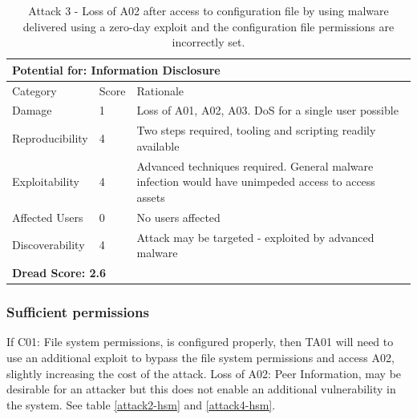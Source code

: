 \documentclass [11pt, proquest] {uwthesis}[2020/02/24]
\begin{document}
\begin{table}[H]
\label{attack3-hsm}
\begin{tabular}{|m{3cm}|m{.9cm}|p{27em} |}
\multicolumn{3}{l}{Potential for: Information Disclosure}                   \\
\hline
Category & Score & Rationale \\
\hline
Damage          & 1     & Loss of A01, A02, A03. DoS for a single user possible            \\
\hline
Reproducibility & 4     & Two steps required, tooling and scripting readily available    \\
\hline
Exploitability & 4      & Advanced techniques required. General malware infection would have unimpeded access to access assets  \\
\hline
Affected Users  & 0     & No users affected                        \\
\hline
Discoverability & 4     & Attack may be targeted - exploited by advanced malware \\
\hline
\multicolumn{3}{l}{\textbf{Dread Score: 2.6}} 
\end{tabular}
\caption{Attack 3 - Loss of A02 after access to configuration file by using malware delivered using a zero-day exploit and the configuration file permissions are incorrectly set.}
\end{table}

\subsubsection{Sufficient permissions}
If C01: File system permissions, is configured properly, then TA01 will need to use an additional exploit to bypass the file system permissions and access A02, slightly increasing the cost of the attack. Loss of A02: Peer Information, may be desirable for an attacker but this does not enable an additional vulnerability in the system.
See table \ref{attack2-hsm} and \ref{attack4-hsm}.
\end{document}
